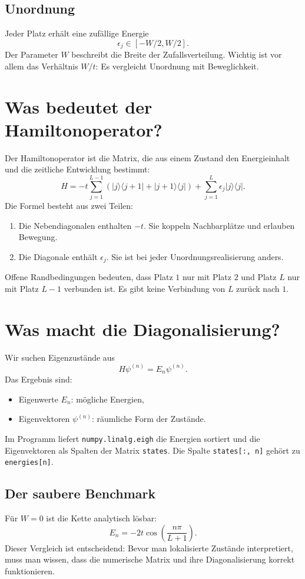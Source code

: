 \documentclass[11pt,a4paper]{article}
\begin{document}
\subsection{Unordnung}
Jeder Platz erhält eine zufällige Energie
\[
 \epsilon_j\in[-W/2,W/2].
\]
Der Parameter $W$ beschreibt die Breite der Zufallsverteilung. Wichtig ist
vor allem das Verhältnis $W/t$: Es vergleicht Unordnung mit Beweglichkeit.

\section{Was bedeutet der Hamiltonoperator?}
Der Hamiltonoperator ist die Matrix, die aus einem Zustand den Energieinhalt
und die zeitliche Entwicklung bestimmt:
\[
 H=-t\sum_{j=1}^{L-1}\left(
 |j\rangle\langle j+1|+|j+1\rangle\langle j|\right)
 +\sum_{j=1}^{L}\epsilon_j|j\rangle\langle j|.
\]
Die Formel besteht aus zwei Teilen:
\begin{enumerate}[label=\arabic*.]
 \item Die Nebendiagonalen enthalten $-t$. Sie koppeln Nachbarplätze und
 erlauben Bewegung.
 \item Die Diagonale enthält $\epsilon_j$. Sie ist bei jeder
 Unordnungsrealisierung anders.
\end{enumerate}
Offene Randbedingungen bedeuten, dass Platz $1$ nur mit Platz $2$ und Platz
$L$ nur mit Platz $L-1$ verbunden ist. Es gibt keine Verbindung von $L$
zurück nach $1$.

\section{Was macht die Diagonalisierung?}
Wir suchen Eigenzustände aus
\[
 H\psi^{(n)}=E_n\psi^{(n)}.
\]
Das Ergebnis sind:
\begin{itemize}
 \item Eigenwerte $E_n$: mögliche Energien,
 \item Eigenvektoren $\psi^{(n)}$: räumliche Form der Zustände.
\end{itemize}
Im Programm liefert \texttt{numpy.linalg.eigh} die Energien sortiert und
die Eigenvektoren als Spalten der Matrix \texttt{states}. Die Spalte
\texttt{states[:, n]} gehört zu \texttt{energies[n]}.

\subsection{Der saubere Benchmark}
Für $W=0$ ist die Kette analytisch lösbar:
\[
 E_n=-2t\cos\left(\frac{n\pi}{L+1}\right).
\]
Dieser Vergleich ist entscheidend: Bevor man lokalisierte Zustände
interpretiert, muss man wissen, dass die numerische Matrix und ihre
Diagonalisierung korrekt funktionieren.
\end{document}
